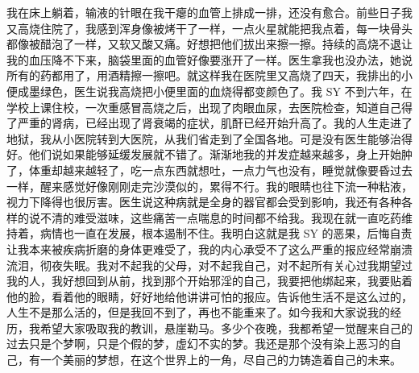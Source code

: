 \begin{case}
    我在床上躺着，输液的针眼在我干瘪的血管上排成一排，还没有愈合。前些日子我又高烧住院了，我感到浑身像被烤干了一样，一点火星就能把我点着，每一块骨头都像被醋泡了一样，又软又酸又痛。好想把他们拔出来擦一擦。持续的高烧不退让我的血压降不下来，脑袋里面的血管好像要涨开了一样。医生拿我也没办法，她说所有的药都用了，用酒精擦一擦吧。就这样我在医院里又高烧了四天，我排出的小便成墨绿色，医生说我高烧把小便里面的血烧得都变颜色了。我 SY 不到六年，在学校上课住校，一次重感冒高烧之后，出现了肉眼血尿，去医院检查，知道自己得了严重的肾病，已经出现了肾衰竭的症状，肌酐已经开始升高了。我的人生走进了地狱，我从小医院转到大医院，从我们省走到了全国各地。可是没有医生能够治得好。他们说如果能够延缓发展就不错了。渐渐地我的并发症越来越多，身上开始肿了，体重却越来越轻了，吃一点东西就想吐，一点力气也没有，睡觉就像要昏过去一样，醒来感觉好像刚刚走完沙漠似的，累得不行。我的眼睛也往下流一种粘液，视力下降得也很厉害。医生说这种病就是全身的器官都会受到影响，我还有各种各样的说不清的难受滋味，这些痛苦一点喘息的时间都不给我。我现在就一直吃药维持着，病情也一直在发展，根本遏制不住。我明白这就是我 SY 的恶果，后悔自责让我本来被疾病折磨的身体更难受了，我的内心承受不了这么严重的报应经常崩溃流泪，彻夜失眠。我对不起我的父母，对不起我自己，对不起所有关心过我期望过我的人，我好想回到从前，找到那个开始邪淫的自己，我要把他绑起来，我要贴着他的脸，看着他的眼睛，好好地给他讲讲可怕的报应。告诉他生活不是这么过的，人生不是那么活的，但是我回不到了，再也不能重来了。如今我和大家说我的经历，我希望大家吸取我的教训，悬崖勒马。多少个夜晚，我都希望一觉醒来自己的过去只是个梦啊，只是个假的梦，虚幻不实的梦。我还是那个没有染上恶习的自己，有一个美丽的梦想，在这个世界上的一角，尽自己的力铸造着自己的未来。


\end{case}

